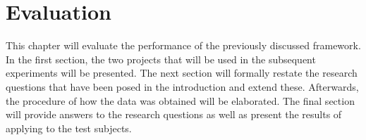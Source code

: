 
\chapter{Evaluation}
\label{ch:evaluation}
This chapter will evaluate the performance of the previously discussed \velocity{} framework. In the first section, the two projects that will be used in the subsequent experiments will be presented. The next section will formally restate the research questions that have been posed in the introduction and extend these. Afterwards, the procedure of how the data was obtained will be elaborated. The final section will provide answers to the research questions as well as present the results of applying \tcp{} to the test subjects.

%
%
%
%